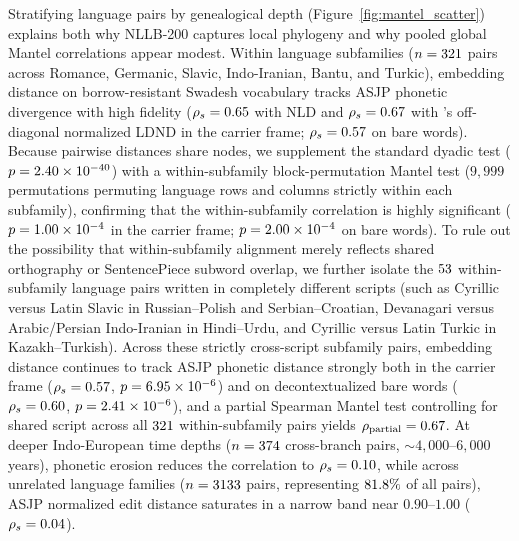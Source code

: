 Stratifying language pairs by genealogical depth (Figure~\ref{fig:mantel_scatter}) explains both why NLLB-200 captures local phylogeny and why pooled global Mantel correlations appear modest.
Within language subfamilies ($n = 321{}$ pairs across Romance, Germanic, Slavic, Indo-Iranian, Bantu, and Turkic), embedding distance on borrow-resistant Swadesh vocabulary tracks ASJP phonetic divergence with high fidelity ($\rho_s = 0.65{}$ with NLD and $\rho_s = 0.67{}$ with \citeauthor{jaeger2018}'s \citeyear{jaeger2018} off-diagonal normalized LDND in the carrier frame; $\rho_s = 0.57{}$ on bare words).
Because pairwise distances share nodes, we supplement the standard dyadic test ($p = 2.40 \times 10^{-40}{}$) with a within-subfamily block-permutation Mantel test ($9{,}999$ permutations permuting language rows and columns strictly within each subfamily), confirming that the within-subfamily correlation is highly significant ($p = 1.00 \times 10^{-4}{}$ in the carrier frame; $p = 2.00 \times 10^{-4}{}$ on bare words).
To rule out the possibility that within-subfamily alignment merely reflects shared orthography or SentencePiece subword overlap, we further isolate the $53{}$ within-subfamily language pairs written in completely different scripts (such as Cyrillic versus Latin Slavic in Russian--Polish and Serbian--Croatian, Devanagari versus Arabic/Persian Indo-Iranian in Hindi--Urdu, and Cyrillic versus Latin Turkic in Kazakh--Turkish).
Across these strictly cross-script subfamily pairs, embedding distance continues to track ASJP phonetic distance strongly both in the carrier frame ($\rho_s = 0.57{}$, $p = 6.95 \times 10^{-6}{}$) and on decontextualized bare words ($\rho_s = 0.60{}$, $p = 2.41 \times 10^{-6}{}$), and a partial Spearman Mantel test controlling for shared script across all $321{}$ within-subfamily pairs yields $\rho_{\text{partial}} = 0.67{}$.
At deeper Indo-European time depths ($n = 374{}$ cross-branch pairs, $\sim 4{,}000$--$6{,}000$ years), phonetic erosion reduces the correlation to $\rho_s = 0.10{}$, while across unrelated language families ($n = 3133{}$ pairs, representing $81.8{}\%$ of all pairs), ASJP normalized edit distance saturates in a narrow band near $0.90$--$1.00$ ($\rho_s = 0.04{}$).
